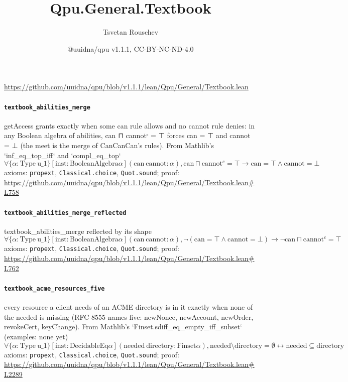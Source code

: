 \documentclass[11pt]{article}
\title{Qpu.General.Textbook}
\author{Tsvetan Rouschev}
\date{@uuidna/qpu v1.1.1, CC-BY-NC-ND-4.0}
\begin{document}
\maketitle
\noindent\url{https://github.com/uuidna/qpu/blob/v1.1.1/lean/Qpu/General/Textbook.lean}

\paragraph{\texttt{textbook\_abilities\_merge}}
getAccess grants exactly when some can rule allows and no cannot rule denies: in any Boolean algebra of abilities, can ⊓ cannotᶜ = ⊤ forces can = ⊤ and cannot = ⊥ (the meet is the merge of CanCanCan's rules). From Mathlib's `inf\_eq\_top\_iff` and `compl\_eq\_top`
\[ \forall \{\alpha : \mathrm{Type}\ \mathrm{u\_1}\} [\mathrm{inst} : \mathrm{BooleanAlgebra} \alpha ] (\mathrm{can}\ \mathrm{cannot} : \alpha ), \mathrm{can} \sqcap \mathrm{cannot}^{c} = \top \to \mathrm{can} = \top \land \mathrm{cannot} = \bot  \]
\noindent axioms: \texttt{propext}, \texttt{Classical.choice}, \texttt{Quot.sound}; proof: \url{https://github.com/uuidna/qpu/blob/v1.1.1/lean/Qpu/General/Textbook.lean\#L758}

\paragraph{\texttt{textbook\_abilities\_merge\_reflected}}
textbook\_abilities\_merge reflected by its shape
\[ \forall \{\alpha : \mathrm{Type}\ \mathrm{u\_1}\} [\mathrm{inst} : \mathrm{BooleanAlgebra} \alpha ] (\mathrm{can}\ \mathrm{cannot} : \alpha ), \neg (\mathrm{can} = \top \land \mathrm{cannot} = \bot ) \to \neg \mathrm{can} \sqcap \mathrm{cannot}^{c} = \top  \]
\noindent axioms: \texttt{propext}, \texttt{Classical.choice}, \texttt{Quot.sound}; proof: \url{https://github.com/uuidna/qpu/blob/v1.1.1/lean/Qpu/General/Textbook.lean\#L762}

\paragraph{\texttt{textbook\_acme\_resources\_five}}
every resource a client needs of an ACME directory is in it exactly when none of the needed is missing (RFC 8555 names five: newNonce, newAccount, newOrder, revokeCert, keyChange). From Mathlib's `Finset.sdiff\_eq\_empty\_iff\_subset` (examples: none yet)
\[ \forall \{\alpha : \mathrm{Type}\ \mathrm{u\_1}\} [\mathrm{inst} : \mathrm{DecidableEq} \alpha ] (\mathrm{needed}\ \mathrm{directory} : \mathrm{Finset} \alpha ), \mathrm{needed} \setminus \mathrm{directory} = \emptyset \leftrightarrow \mathrm{needed} \subseteq \mathrm{directory} \]
\noindent axioms: \texttt{propext}, \texttt{Classical.choice}, \texttt{Quot.sound}; proof: \url{https://github.com/uuidna/qpu/blob/v1.1.1/lean/Qpu/General/Textbook.lean\#L2289}
\end{document}
